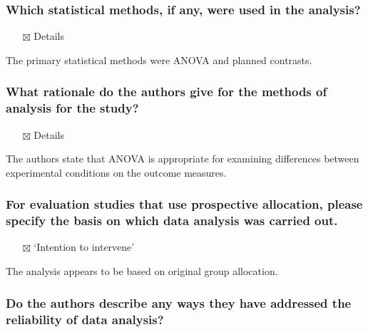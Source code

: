 \documentclass[
  doc, a4paper]{apa7}
\providecommand{\tightlist}{%
  \setlength{\itemsep}{0pt}\setlength{\parskip}{0pt}}
\begin{document}
\subsubsection{Which statistical methods, if any, were used in the analysis?}\label{which-statistical-methods-if-any-were-used-in-the-analysis}

\begin{itemize}
\tightlist
\item[$\boxtimes$]
  Details
\end{itemize}

The primary statistical methods were ANOVA and planned contrasts.

\subsubsection{What rationale do the authors give for the methods of analysis for the study?}\label{what-rationale-do-the-authors-give-for-the-methods-of-analysis-for-the-study}

\begin{itemize}
\tightlist
\item[$\boxtimes$]
  Details
\end{itemize}

The authors state that ANOVA is appropriate for examining differences between experimental conditions on the outcome measures.

\subsubsection{For evaluation studies that use prospective allocation, please specify the basis on which data analysis was carried out.}\label{for-evaluation-studies-that-use-prospective-allocation-please-specify-the-basis-on-which-data-analysis-was-carried-out.}

\begin{itemize}
\tightlist
\item[$\boxtimes$]
  `Intention to intervene'
\end{itemize}

The analysis appears to be based on original group allocation.

\subsubsection{Do the authors describe any ways they have addressed the reliability of data analysis?}\label{do-the-authors-describe-any-ways-they-have-addressed-the-reliability-of-data-analysis}
\end{document}
